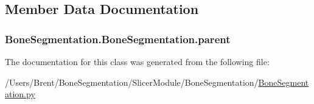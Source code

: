 \subsection{Member Data Documentation}
\hypertarget{class_bone_segmentation_1_1_bone_segmentation_ae7b41133a285837a0054a553cbd40d2c}{}
\subsubsection[{parent}]{\setlength{\rightskip}{0pt plus 5cm}Bone\+Segmentation.\+Bone\+Segmentation.\+parent}\label{class_bone_segmentation_1_1_bone_segmentation_ae7b41133a285837a0054a553cbd40d2c}


The documentation for this class was generated from the following file\+:\begin{DoxyCompactItemize}
\item 
/\+Users/\+Brent/\+Bone\+Segmentation/\+Slicer\+Module/\+Bone\+Segmentation/\hyperlink{_bone_segmentation_8py}{Bone\+Segmentation.\+py}\end{DoxyCompactItemize}
